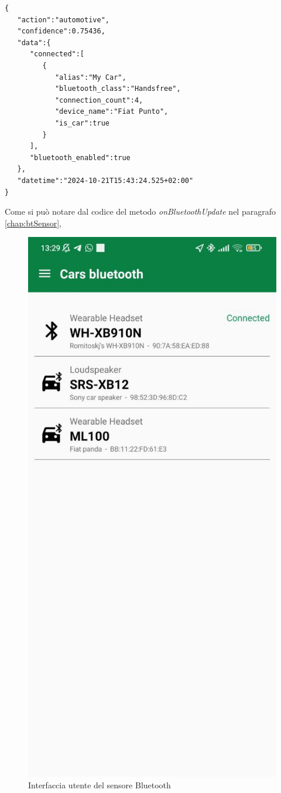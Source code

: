 \begin{verbatim}
{
   "action":"automotive",
   "confidence":0.75436,
   "data":{
      "connected":[
         {
            "alias":"My Car",
            "bluetooth_class":"Handsfree",
            "connection_count":4,
            "device_name":"Fiat Punto",
            "is_car":true
         }
      ],
      "bluetooth_enabled":true
   },
   "datetime":"2024-10-21T15:43:24.525+02:00"
}
\end{verbatim}
Come si può notare dal codice del metodo \textit{onBluetoothUpdate} nel paragrafo \ref{chap:btSensor},
\begin{figure}
    \centering
    \includegraphics[width=0.9\linewidth]{images/bluetooth_activity.jpg}
    \caption{Interfaccia utente del sensore Bluetooth}
    \label{fig:bluetooth_activity}
\end{figure}
